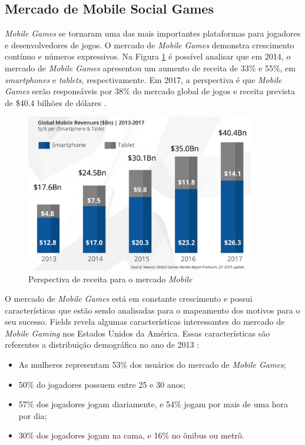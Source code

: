 

  \subsection{Mercado de Mobile Social Games}

\textit{Mobile Games} se tornaram uma das mais importantes plataformas para jogadores e desenvolvedores de jogos. O mercado de \textit{Mobile Games} demonstra crescimento contínuo e números expressivos. Na Figura \ref{figura:gmgcMarket} é possível analisar que em 2014, o mercado de \textit{Mobile Games} apresentou um aumento de receita de 33\% e 55\%, em \textit{smartphones} e \textit{tablets}, respectivamente. Em 2017, a perspectiva é que \textit{Mobile Games} serão responsáveis por 38\% do mercado global de jogos e receita prevista de \$40.4 bilhões de dólares \cite{gmgc}.

\begin{figure}[h]
  \centering
  \includegraphics[width=10cm]{figuras/gmgcMarket}
  \caption{Perspectiva de receita para o mercado \textit{Mobile} \cite{gmgc}}
  \label{figura:gmgcMarket}
\end{figure}

O mercado de \textit{Mobile Games} está em constante crescimento e possui características que estão sendo analisadas para o mapeamento dos motivos para o seu sucesso. Fields revela algumas características interessantes do mercado de \textit{Mobile Gaming} nos Estados Unidos da América. Essas características são referentes a distribuição demográfica no ano de 2013 \cite{fields2014}:

\begin{itemize}
  \item As mulheres representam 53\% dos usuários do mercado de \textit{Mobile Games};
  \item 50\% do jogadores possuem entre 25 e 30 anos;
  \item 57\% dos jogadores jogam diariamente, e 54\% jogam por mais de uma hora por dia;
  \item 30\% dos jogadores jogam na cama, e 16\% no ônibus ou metrô.
\end{itemize}

